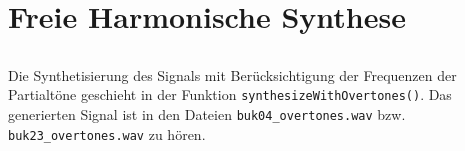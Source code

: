 

\section{Freie Harmonische Synthese}
\label{sec:3}


\subsection{}
Die Synthetisierung des Signals mit Berücksichtigung der Frequenzen der Partialtöne geschieht in der Funktion \texttt{synthesizeWithOvertones()}.
Das generierten Signal ist in den Dateien \texttt{buk04\_overtones.wav} bzw. \texttt{buk23\_overtones.wav} zu hören.


\subsection{}


